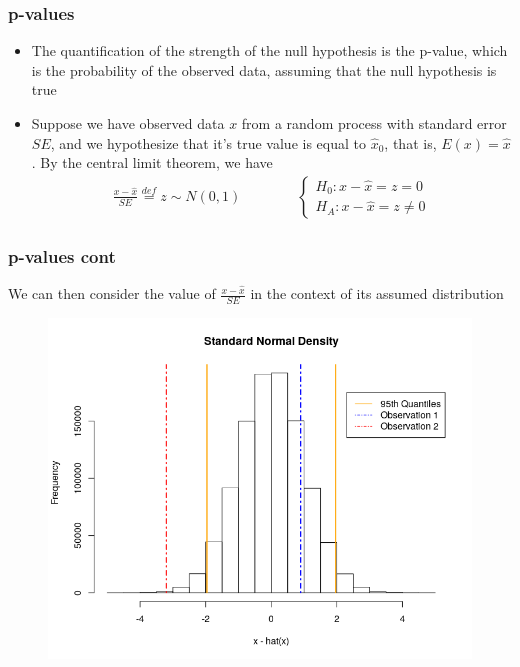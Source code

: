 \documentclass[11pt]{beamer}
\begin{document}
\begin{frame}
\frametitle{p-values}
{
\begin{itemize}
\item The quantification of the strength of the null hypothesis is the p-value, which is the probability of the observed data, assuming that the null hypothesis is true \\
\item Suppose we have observed data $x$ from a random process with standard error $SE$, and we hypothesize that it's true value is equal to $\hat{x}_0$, that is, $E(x) = \hat{x}$. By the central limit theorem, we have
\begin{align*}
\frac{x - \hat{x}}{SE} \stackrel{def}{=} z \sim N(0,1) \qquad \qquad 
\begin{cases}
H_0: x - \hat{x} = z = 0 \\
H_A: x - \hat{x} = z \not= 0
\end{cases}
\end{align*}
\end{itemize}
}
\end{frame}

\begin{frame}
\frametitle{p-values cont}
{
We can then consider the value of $\frac{x - \hat{x}}{SE}$ in the context of its assumed distribution

\begin{figure}
\includegraphics[scale = 0.4]{normalPlot.png} \\
\end{figure}
}
\end{frame}
\end{document}
